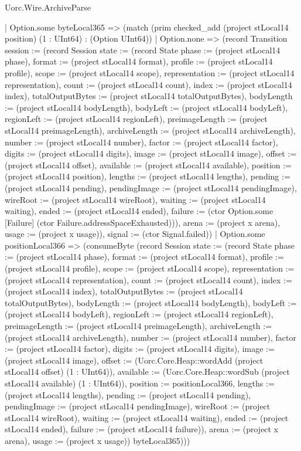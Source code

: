 \begin{lexlean}{Uorc.Wire.ArchiveParse}
\begin{semanticmodule}
{              | Option.some byteLocal365 => (match (prim checked_add (project stLocal14 position) (1 : UInt64) : (Option UInt64))
                | Option.none => (record Transition {session := (record Session {state := (record State {phase := (project stLocal14 phase), format := (project stLocal14 format), profile := (project stLocal14 profile), scope := (project stLocal14 scope), representation := (project stLocal14 representation), count := (project stLocal14 count), index := (project stLocal14 index), totalOutputBytes := (project stLocal14 totalOutputBytes), bodyLength := (project stLocal14 bodyLength), bodyLeft := (project stLocal14 bodyLeft), regionLeft := (project stLocal14 regionLeft), preimageLength := (project stLocal14 preimageLength), archiveLength := (project stLocal14 archiveLength), number := (project stLocal14 number), factor := (project stLocal14 factor), digits := (project stLocal14 digits), image := (project stLocal14 image), offset := (project stLocal14 offset), available := (project stLocal14 available), position := (project stLocal14 position), lengths := (project stLocal14 lengths), pending := (project stLocal14 pending), pendingImage := (project stLocal14 pendingImage), wireRoot := (project stLocal14 wireRoot), waiting := (project stLocal14 waiting), ended := (project stLocal14 ended), failure := (ctor Option.some [Failure] (ctor Failure.addressSpaceExhausted))}), arena := (project x arena), usage := (project x usage)}), signal := (ctor Signal.failed)})
                | Option.some positionLocal366 => (consumeByte (record Session {state := (record State {phase := (project stLocal14 phase), format := (project stLocal14 format), profile := (project stLocal14 profile), scope := (project stLocal14 scope), representation := (project stLocal14 representation), count := (project stLocal14 count), index := (project stLocal14 index), totalOutputBytes := (project stLocal14 totalOutputBytes), bodyLength := (project stLocal14 bodyLength), bodyLeft := (project stLocal14 bodyLeft), regionLeft := (project stLocal14 regionLeft), preimageLength := (project stLocal14 preimageLength), archiveLength := (project stLocal14 archiveLength), number := (project stLocal14 number), factor := (project stLocal14 factor), digits := (project stLocal14 digits), image := (project stLocal14 image), offset := (Uorc.Core.Heap::wordAdd (project stLocal14 offset) (1 : UInt64)), available := (Uorc.Core.Heap::wordSub (project stLocal14 available) (1 : UInt64)), position := positionLocal366, lengths := (project stLocal14 lengths), pending := (project stLocal14 pending), pendingImage := (project stLocal14 pendingImage), wireRoot := (project stLocal14 wireRoot), waiting := (project stLocal14 waiting), ended := (project stLocal14 ended), failure := (project stLocal14 failure)}), arena := (project x arena), usage := (project x usage)}) byteLocal365)))
}
\end{semanticmodule}
\end{lexlean}
